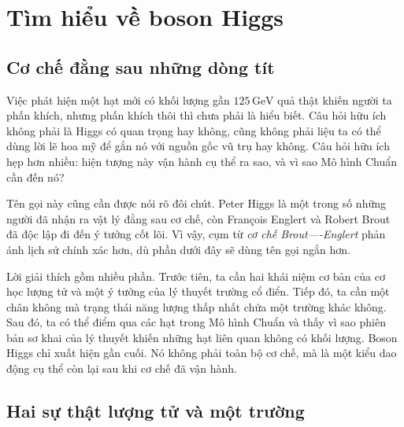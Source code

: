 \chapter{Tìm hiểu về boson Higgs}


\section{Cơ chế đằng sau những dòng tít}

Việc phát hiện một hạt mới có khối lượng gần $125\,\mathrm{GeV}$ quả thật khiến người ta phấn khích, nhưng phấn khích thôi thì chưa phải là hiểu biết. Câu hỏi hữu ích không phải là Higgs có quan trọng hay không, cũng không phải liệu ta có thể dùng lời lẽ hoa mỹ để gắn nó với nguồn gốc vũ trụ hay không. Câu hỏi hữu ích hẹp hơn nhiều: hiện tượng này vận hành cụ thể ra sao, và vì sao Mô hình Chuẩn cần đến nó?

Tên gọi này cũng cần được nói rõ đôi chút. Peter Higgs là một trong số những người đã nhận ra vật lý đằng sau cơ chế, còn Fran\c{c}ois Englert và Robert Brout đã độc lập đi đến ý tưởng cốt lõi. Vì vậy, cụm từ \emph{cơ chế Brout----Englert} phản ánh lịch sử chính xác hơn, dù phần dưới đây sẽ dùng tên gọi ngắn hơn.

Lời giải thích gồm nhiều phần. Trước tiên, ta cần hai khái niệm cơ bản của cơ học lượng tử và một ý tưởng của lý thuyết trường cổ điển. Tiếp đó, ta cần một chân không mà trạng thái năng lượng thấp nhất chứa một trường khác không. Sau đó, ta có thể điểm qua các hạt trong Mô hình Chuẩn và thấy vì sao phiên bản sơ khai của lý thuyết khiến những hạt liên quan không có khối lượng. Boson Higgs chỉ xuất hiện gần cuối. Nó không phải toàn bộ cơ chế, mà là một kiểu dao động cụ thể còn lại sau khi cơ chế đã vận hành.

\section{Hai sự thật lượng tử và một trường}

